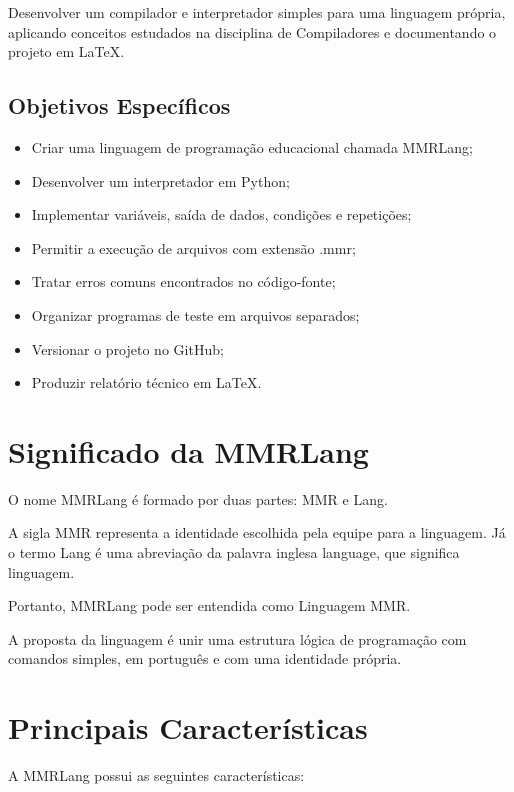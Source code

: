 \documentclass[12pt,a4paper]{article}
\begin{document}
Desenvolver um compilador e interpretador simples para uma linguagem própria, aplicando conceitos estudados na disciplina de Compiladores e documentando o projeto em LaTeX.

\subsection{Objetivos Específicos}

\begin{itemize}
\item Criar uma linguagem de programação educacional chamada MMRLang;
\item Desenvolver um interpretador em Python;
\item Implementar variáveis, saída de dados, condições e repetições;
\item Permitir a execução de arquivos com extensão .mmr;
\item Tratar erros comuns encontrados no código-fonte;
\item Organizar programas de teste em arquivos separados;
\item Versionar o projeto no GitHub;
\item Produzir relatório técnico em LaTeX.
\end{itemize}

\section{Significado da MMRLang}

O nome MMRLang é formado por duas partes: MMR e Lang.

A sigla MMR representa a identidade escolhida pela equipe para a linguagem. Já o termo Lang é uma abreviação da palavra inglesa language, que significa linguagem.

Portanto, MMRLang pode ser entendida como Linguagem MMR.

A proposta da linguagem é unir uma estrutura lógica de programação com comandos simples, em português e com uma identidade própria.

\section{Principais Características}

A MMRLang possui as seguintes características:
\end{document}
